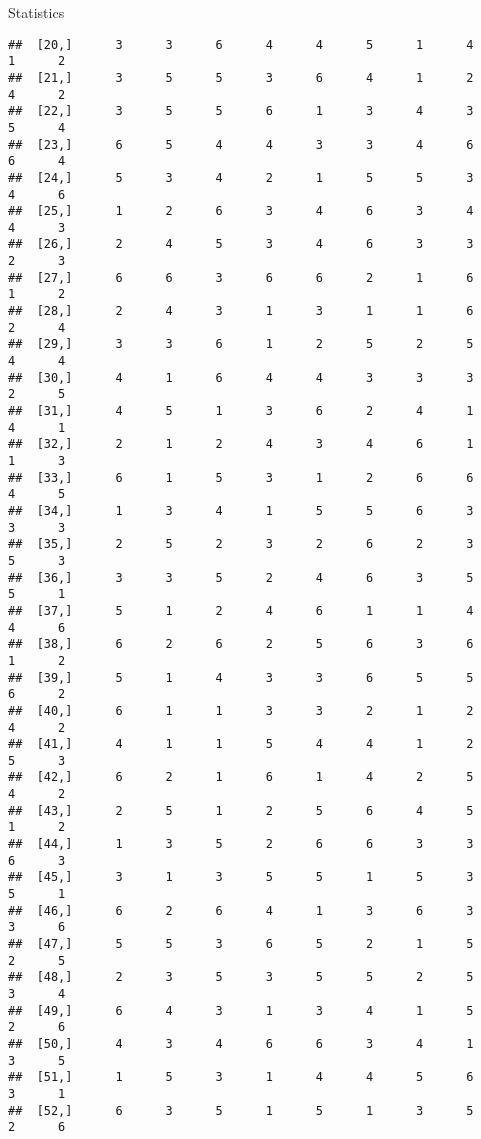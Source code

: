\documentclass[
  ignorenonframetext,
]{beamer}
\begin{document}
\begin{frame}[fragile]{Statistics}
\begin{verbatim}
##  [20,]      3      3      6      4      4      5      1      4      1      2
##  [21,]      3      5      5      3      6      4      1      2      4      2
##  [22,]      3      5      5      6      1      3      4      3      5      4
##  [23,]      6      5      4      4      3      3      4      6      6      4
##  [24,]      5      3      4      2      1      5      5      3      4      6
##  [25,]      1      2      6      3      4      6      3      4      4      3
##  [26,]      2      4      5      3      4      6      3      3      2      3
##  [27,]      6      6      3      6      6      2      1      6      1      2
##  [28,]      2      4      3      1      3      1      1      6      2      4
##  [29,]      3      3      6      1      2      5      2      5      4      4
##  [30,]      4      1      6      4      4      3      3      3      2      5
##  [31,]      4      5      1      3      6      2      4      1      4      1
##  [32,]      2      1      2      4      3      4      6      1      1      3
##  [33,]      6      1      5      3      1      2      6      6      4      5
##  [34,]      1      3      4      1      5      5      6      3      3      3
##  [35,]      2      5      2      3      2      6      2      3      5      3
##  [36,]      3      3      5      2      4      6      3      5      5      1
##  [37,]      5      1      2      4      6      1      1      4      4      6
##  [38,]      6      2      6      2      5      6      3      6      1      2
##  [39,]      5      1      4      3      3      6      5      5      6      2
##  [40,]      6      1      1      3      3      2      1      2      4      2
##  [41,]      4      1      1      5      4      4      1      2      5      3
##  [42,]      6      2      1      6      1      4      2      5      4      2
##  [43,]      2      5      1      2      5      6      4      5      1      2
##  [44,]      1      3      5      2      6      6      3      3      6      3
##  [45,]      3      1      3      5      5      1      5      3      5      1
##  [46,]      6      2      6      4      1      3      6      3      3      6
##  [47,]      5      5      3      6      5      2      1      5      2      5
##  [48,]      2      3      5      3      5      5      2      5      3      4
##  [49,]      6      4      3      1      3      4      1      5      2      6
##  [50,]      4      3      4      6      6      3      4      1      3      5
##  [51,]      1      5      3      1      4      4      5      6      3      1
##  [52,]      6      3      5      1      5      1      3      5      2      6

\end{verbatim}
\end{frame}
\end{document}
